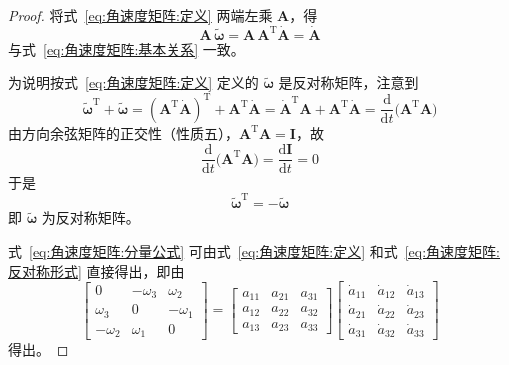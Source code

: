 \begin{proof}
    将式~\eqref{eq:角速度矩阵:定义} 两端左乘 $\bm{A}$，得
\begin{equation}
    \bm{A}\,\bm{\tilde{\omega}}=\bm{A}\,\bm{A}^{\mathrm{T}}\dot{\bm{A}}=\dot{\bm{A}}
    \label{eq:角速度矩阵:推导基本关系}
\end{equation}
与式~\eqref{eq:角速度矩阵:基本关系} 一致。

为说明按式~\eqref{eq:角速度矩阵:定义} 定义的 $\bm{\tilde{\omega}}$ 是反对称矩阵，注意到
\begin{equation}
    \bm{\tilde{\omega}}^{\mathrm{T}}+\bm{\tilde{\omega}}
    =(\bm{A}^{\mathrm{T}}\dot{\bm{A}})^{\mathrm{T}}+\bm{A}^{\mathrm{T}}\dot{\bm{A}}
    =\dot{\bm{A}}^{\mathrm{T}}\bm{A}+\bm{A}^{\mathrm{T}}\dot{\bm{A}}
    =\frac{\mathrm{d}}{\mathrm{d}t}\bigl(\bm{A}^{\mathrm{T}}\bm{A}\bigr)
    \label{eq:角速度矩阵:反对称推导}
\end{equation}
由方向余弦矩阵的正交性（性质五），$\bm{A}^{\mathrm{T}}\bm{A}=\bm{I}$，故
\begin{equation}
    \frac{\mathrm{d}}{\mathrm{d}t}\bigl(\bm{A}^{\mathrm{T}}\bm{A}\bigr)=\frac{\mathrm{d}\bm{I}}{\mathrm{d}t}=0
\end{equation}
于是
\begin{equation}
    \bm{\tilde{\omega}}^{\mathrm{T}}=-\bm{\tilde{\omega}}
    \label{eq:角速度矩阵:反对称性}
\end{equation}
即 $\bm{\tilde{\omega}}$ 为反对称矩阵。

式~\eqref{eq:角速度矩阵:分量公式} 可由式~\eqref{eq:角速度矩阵:定义} 和式~\eqref{eq:角速度矩阵:反对称形式} 直接得出，即由
\begin{equation}
    \begin{bmatrix}
        0&-\omega_{3}&\omega_{2}\\
        \omega_{3}&0&-\omega_{1}\\
        -\omega_{2}&\omega_{1}&0
    \end{bmatrix}
    =
    \begin{bmatrix}
        a_{11}&a_{21}&a_{31}\\
        a_{12}&a_{22}&a_{32}\\
        a_{13}&a_{23}&a_{33}
    \end{bmatrix}
    \begin{bmatrix}
        \dot{a}_{11}&\dot{a}_{12}&\dot{a}_{13}\\
        \dot{a}_{21}&\dot{a}_{22}&\dot{a}_{23}\\
        \dot{a}_{31}&\dot{a}_{32}&\dot{a}_{33}
    \end{bmatrix}
    \label{eq:角速度矩阵:推导分量公式}
\end{equation}
得出。

\end{proof}

